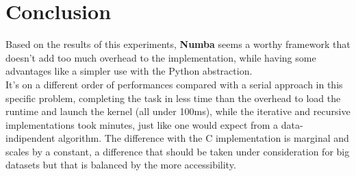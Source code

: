 \documentclass[a4paper, 12pt, oneside]{article}
\begin{document}
\section{Conclusion}
Based on the results of this experiments, \textbf{Numba} seems a worthy framework that doesn't add too much overhead to the implementation, while having some advantages like a simpler use with the Python abstraction.\\
It's on a different order of performances compared with a serial approach in this specific problem, completing the task in less time than the overhead to load the runtime and launch the kernel (all under 100ms), while the iterative and recursive implementations took minutes, just like one would expect from a data-indipendent algorithm.
The difference with the C implementation is marginal and scales by a constant, a difference that should be taken under consideration for big datasets but that is balanced by the more accessibility.
\printbibliography
\end{document}
